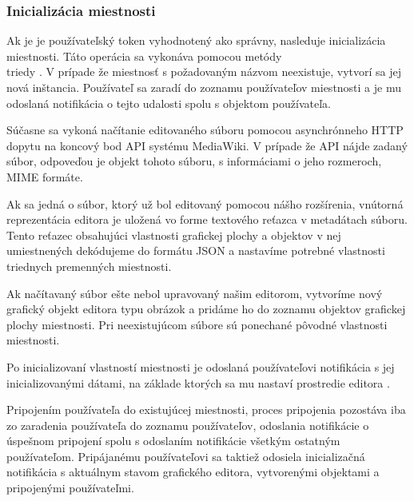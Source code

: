 \subsubsection{Inicializácia miestnosti}
Ak je je používateľský token vyhodnotený ako správny, nasleduje inicializácia miestnosti. Táto operácia sa vykonáva pomocou metódy \\ triedy . V prípade že miestnosť s požadovaným názvom neexistuje, vytvorí sa jej nová inštancia. Používateľ sa zaradí do zoznamu používateľov miestnosti a je mu odoslaná notifikácia o tejto udalosti spolu s objektom používateľa.

Súčasne sa vykoná načítanie editovaného súboru pomocou asynchrónneho HTTP dopytu na koncový bod API systému MediaWiki. V prípade že API nájde zadaný súbor, odpoveďou je objekt tohoto súboru, s informáciami o jeho rozmeroch, MIME formáte. 

Ak sa jedná o súbor, ktorý už bol editovaný pomocou nášho rozšírenia, vnútorná reprezentácia editora je uložená vo forme textového reťazca v metadátach súboru. Tento reťazec obsahujúci vlastnosti grafickej plochy a objektov v nej umiestnených dekódujeme do formátu JSON a nastavíme potrebné vlastnosti triednych premenných miestnosti. 

Ak načítavaný súbor ešte nebol upravovaný našim editorom, vytvoríme nový grafický objekt editora typu obrázok a pridáme ho do zoznamu objektov grafickej plochy miestnosti. Pri neexistujúcom súbore sú ponechané pôvodné vlastnosti miestnosti.

Po inicializovaní vlastností miestnosti je odoslaná používateľovi notifikácia s jej inicializovanými dátami, na základe ktorých sa mu nastaví prostredie editora .

Pripojením používateľa do existujúcej miestnosti, proces pripojenia pozostáva iba zo zaradenia používateľa do zoznamu používateľov, odoslania notifikácie o úspešnom pripojení spolu s odoslaním notifikácie všetkým ostatným používateľom. Pripájanému používateľovi sa taktiež odosiela inicializačná notifikácia s aktuálnym stavom grafického editora, vytvorenými objektami a pripojenými používateľmi.

